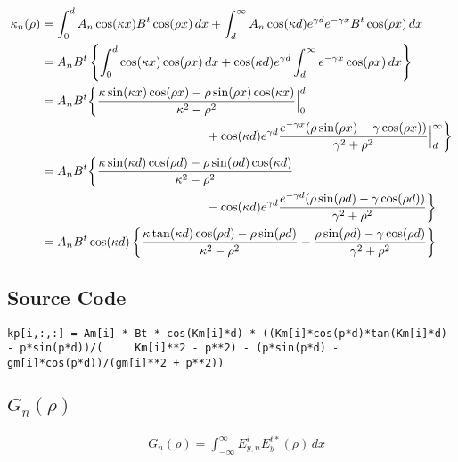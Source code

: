 \documentclass[11pt, oneside]{article}   	%
\begin{document}
\begin{align*}
\kappa_{n}(\rho) &= \int_{0}^{d} A_{n}\cos(\kappa x) B^{t}\cos(\rho x) \, dx + \int_{d}^{\infty} A_{n}\cos(\kappa d)e^{\gamma d}e^{-\gamma x} B^{t}\cos(\rho x) \, dx \\
&= A_{n}B^{t} \left\{ \int_{0}^{d} \cos(\kappa x) \cos(\rho x) \, dx + \cos(\kappa d)e^{\gamma d} \int_{d}^{\infty} e^{-\gamma x} \cos(\rho x) \, dx \right\} \\
&= A_{n}B^{t} \bigg\{ \frac{\kappa\sin(\kappa x) \cos(\rho x) - \rho\sin(\rho x) \cos(\kappa x)}{\kappa^{2}-\rho^{2}} \Big|_{0}^{d}  \\
	&\hspace{132px} {} + \cos(\kappa d)e^{\gamma d} \frac{e^{-\gamma x}(\rho \sin(\rho x) - \gamma \cos(\rho x))}{\gamma^{2} + \rho^{2}} \Big|_{d}^{\infty}  \bigg\} \\
&= A_{n}B^{t} \bigg\{ \frac{\kappa\sin(\kappa d) \cos(\rho d) - \rho\sin(\rho d) \cos(\kappa d)}{\kappa^{2}-\rho^{2}}  \\
	&\hspace{132px} {} - \cos(\kappa d)e^{\gamma d} \frac{e^{-\gamma d}(\rho \sin(\rho d) - \gamma \cos(\rho d))}{\gamma^{2} + \rho^{2}}  \bigg\} \\
&= A_{n}B^{t} \cos(\kappa d) \left\{ \frac{\kappa \tan(\kappa d) \cos(\rho d)  - \rho \sin(\rho d)}{\kappa^{2}-\rho^{2}} 
	- \frac{\rho \sin(\rho d) - \gamma \cos(\rho d)}{\gamma^{2} + \rho^{2}}  \right\} \label{eq:kappa-solution}
\end{align*}

\subsection{Source Code}

\begin{lstlisting}
kp[i,:,:] = Am[i] * Bt * cos(Km[i]*d) * ((Km[i]*cos(p*d)*tan(Km[i]*d) - p*sin(p*d))/(     Km[i]**2 - p**2) - (p*sin(p*d) - gm[i]*cos(p*d))/(gm[i]**2 + p**2))
\end{lstlisting}


\subsection{$G_{n}(\rho)$}

\begin{align}
&G_{n}(\rho) = \int_{-\infty}^{\infty} E_{y,n}^{i} E_{y}^{t*}(\rho) \, dx
\end{align}
\end{document}
